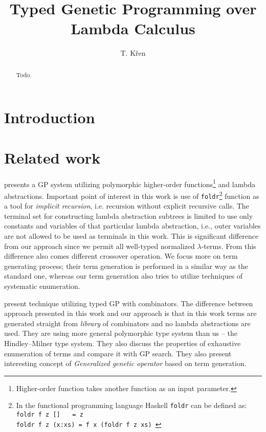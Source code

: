 \documentclass[11pt]{article}
\newcommand{\lterms}{$\lambda$-terms\xspace}
\begin{document}
\title{Typed Genetic Programming over Lambda Calculus}

\author{T. K\v ren}



\begin{abstract}
Todo.
\end{abstract}

\begin{article}

\section{Introduction}

\section{Related work}
\label{related}

\cite{yu01} presents a GP system utilizing
polymorphic higher-order functions\footnote{Higher-order 
function takes another function as an input parameter.
} and lambda abstractions.
Important point of interest in this work is use of \texttt{foldr}\footnote{ In the functional programming language Haskell \texttt{foldr} can be defined as:\\ \texttt{foldr f z [] $~~~$  = z\\ 
foldr f z (x:xs) = f x (foldr f z xs) }} function as a tool for \textit{implicit recursion},
i.e. recursion without explicit recursive calls. 
The terminal set for constructing lambda abstraction subtrees 
is limited to use only constants and variables of that particular
lambda abstraction, i.e., outer variables are not allowed to be used
as terminals in this work. This is significant difference from our approach 
since we permit all well-typed normalized \lterms. From this difference also
comes different crossover operation. We focus more on term generating process; 
their term generation is performed in a similar way as the standard one, 
whereas our term generation also tries to utilize techniques of systematic enumeration. 

\cite{kes} present technique 
utilizing typed GP with combinators.
The difference between approach presented in this work
and our approach is that in this work terms are generated
straight from \textit{library} of combinators and no lambda abstractions
are used. They are using more general polymorphic type system than us
-- the Hindley–Milner type system. They also discuss the 
properties of exhaustive enumeration of terms and compare it with GP search.  
They also present interesting concept of \textit{Generalized
genetic operator} based on term generation. 


\end{article}
\end{document}
